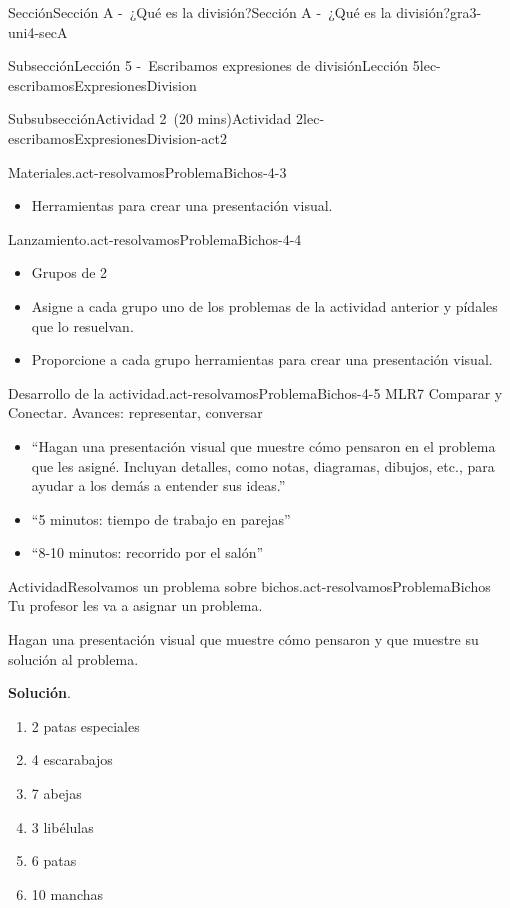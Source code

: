 \documentclass[oneside,10pt,]{article}
\newcommand{\blocktitlefont}{\relax}
\begin{document}
\begin{sectionptx}{Sección}{Sección A -~¿Qué es la división?}{}{Sección A -~¿Qué es la división?}{}{}{gra3-uni4-secA}
\begin{subsectionptx}{Subsección}{Lección 5 -~Escribamos expresiones de división}{}{Lección 5}{}{}{lec-escribamosExpresionesDivision}
\begin{subsubsectionptx}{Subsubsección}{Actividad 2~(20 mins)}{}{Actividad 2}{}{}{lec-escribamosExpresionesDivision-act2}
\begin{paragraphs}{Materiales.}{act-resolvamosProblemaBichos-4-3}
%
\begin{itemize}[label=\textbullet]
\item{}Herramientas para crear una presentación visual.%
\end{itemize}
\end{paragraphs}%
\begin{paragraphs}{Lanzamiento.}{act-resolvamosProblemaBichos-4-4}%
%
\begin{itemize}[label=\textbullet]
\item{}Grupos de 2%
\item{}Asigne a cada grupo uno de los problemas de la actividad anterior y pídales que lo resuelvan.%
\item{}Proporcione a cada grupo herramientas para crear una presentación visual.%
\end{itemize}
\end{paragraphs}%
\begin{paragraphs}{Desarrollo de la actividad.}{act-resolvamosProblemaBichos-4-5}%
MLR7 Comparar y Conectar. Avances: representar, conversar%
%
\begin{itemize}[label=\textbullet]
\item{}``Hagan una presentación visual que muestre cómo pensaron en el problema que les asigné. Incluyan detalles, como notas, diagramas, dibujos, etc., para ayudar a los demás a entender sus ideas.''%
\item{}``5 minutos: tiempo de trabajo en parejas''%
\item{}``8-10 minutos: recorrido por el salón''%
\end{itemize}
\end{paragraphs}%
\begin{activity}{Actividad}{Resolvamos un problema sobre bichos.}{act-resolvamosProblemaBichos}%
Tu profesor les va a asignar un problema.%
\par
Hagan una presentación visual que muestre cómo pensaron y que muestre su solución al problema.%
\par\smallskip%
\noindent\textbf{\blocktitlefont Solución}.\hypertarget{act-resolvamosProblemaBichos-3}{}\quad{}%
\begin{enumerate}[label={\Alph*.}]
\item{}2 patas especiales%
\item{}4 escarabajos%
\item{}7 abejas%
\item{}3 libélulas%
\item{}6 patas%
\item{}10 manchas%

\end{enumerate}
\end{activity}
\end{subsubsectionptx}
\end{subsectionptx}
\end{sectionptx}
\end{document}
